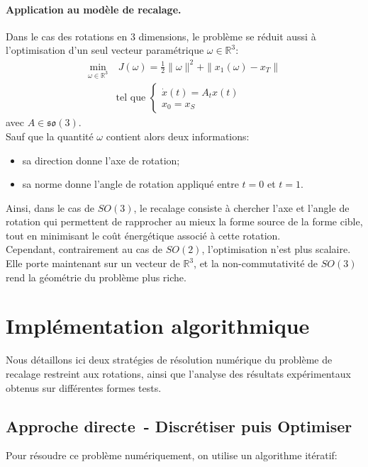 \documentclass[12pt]{report}
\begin{document}
\subsubsection{Application au modèle de recalage.}
Dans le cas des rotations en 3 dimensions, le problème se réduit aussi à l'optimisation d'un seul vecteur paramétrique $\omega\in\mathbb{R}^3$:
\[
\begin{aligned}
\min_{\omega\in \mathbb{R}^3}&~J(\omega)=\frac{1}{2}\|\omega\|^2+\|x_1(\omega)-x_T\|\\
&\text{tel que }\left\{\begin{array}{ll}\dot{x}(t)=A_{t}x(t)\\x_0=x_S\end{array}\right.
\end{aligned}
\]
avec $A\in \mathfrak{so}(3)$.\\
Sauf que la quantité $\omega$ contient alors deux informations:
\begin{itemize}
    \item sa direction donne l'axe de rotation;
    \item sa norme donne l'angle de rotation appliqué entre $t=0$ et $t=1$.
\end{itemize}
Ainsi, dans le cas de $SO(3)$, le recalage consiste à chercher l'axe et l'angle de rotation qui permettent de rapprocher au mieux la forme source de la forme cible, tout en minimisant le coût énergétique associé à cette rotation.\\
Cependant, contrairement au cas de $SO(2)$, l'optimisation n'est plus scalaire. Elle porte maintenant sur un vecteur de $\mathbb{R}^3$, et la non-commutativité de $SO(3)$ rend la géométrie du problème plus riche.


\chapter{Implémentation algorithmique}

Nous détaillons ici deux stratégies de résolution numérique du problème de recalage restreint aux rotations, ainsi que l'analyse des résultats expérimentaux obtenus sur différentes formes tests.

\section{Approche directe~- Discrétiser puis Optimiser}

Pour résoudre ce problème numériquement, on utilise un algorithme itératif:
\end{document}
